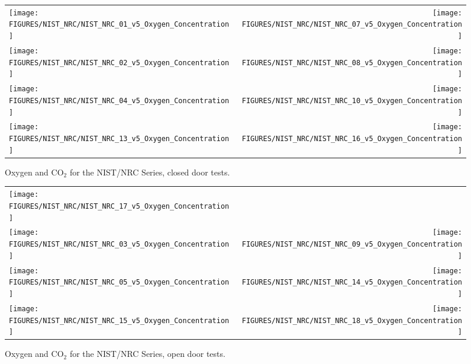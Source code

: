 \begin{figure}[p]
\begin{tabular*}{\textwidth}{l@{\extracolsep{\fill}}r}
\texttt{[image: FIGURES/NIST\_NRC/NIST\_NRC\_01\_v5\_Oxygen\_Concentration]} &
\texttt{[image: FIGURES/NIST\_NRC/NIST\_NRC\_07\_v5\_Oxygen\_Concentration]} \\
\texttt{[image: FIGURES/NIST\_NRC/NIST\_NRC\_02\_v5\_Oxygen\_Concentration]} &
\texttt{[image: FIGURES/NIST\_NRC/NIST\_NRC\_08\_v5\_Oxygen\_Concentration]} \\
\texttt{[image: FIGURES/NIST\_NRC/NIST\_NRC\_04\_v5\_Oxygen\_Concentration]} &
\texttt{[image: FIGURES/NIST\_NRC/NIST\_NRC\_10\_v5\_Oxygen\_Concentration]} \\
\texttt{[image: FIGURES/NIST\_NRC/NIST\_NRC\_13\_v5\_Oxygen\_Concentration]} &
\texttt{[image: FIGURES/NIST\_NRC/NIST\_NRC\_16\_v5\_Oxygen\_Concentration]}
\end{tabular*}
\caption{Oxygen and CO$_2$ for the NIST/NRC Series, closed door tests.}
\label{NIST_NRC_Gas_Closed}
\end{figure}

\begin{figure}[p]
\begin{tabular*}{\textwidth}{l@{\extracolsep{\fill}}r}
\texttt{[image: FIGURES/NIST\_NRC/NIST\_NRC\_17\_v5\_Oxygen\_Concentration]} &
 \\
\texttt{[image: FIGURES/NIST\_NRC/NIST\_NRC\_03\_v5\_Oxygen\_Concentration]} &
\texttt{[image: FIGURES/NIST\_NRC/NIST\_NRC\_09\_v5\_Oxygen\_Concentration]} \\
\texttt{[image: FIGURES/NIST\_NRC/NIST\_NRC\_05\_v5\_Oxygen\_Concentration]} &
\texttt{[image: FIGURES/NIST\_NRC/NIST\_NRC\_14\_v5\_Oxygen\_Concentration]} \\
\texttt{[image: FIGURES/NIST\_NRC/NIST\_NRC\_15\_v5\_Oxygen\_Concentration]} &
\texttt{[image: FIGURES/NIST\_NRC/NIST\_NRC\_18\_v5\_Oxygen\_Concentration]}
\end{tabular*}
\caption{Oxygen and CO$_2$ for the NIST/NRC Series, open door tests.}
\label{NIST_NRC_Gas_Open}
\end{figure}

